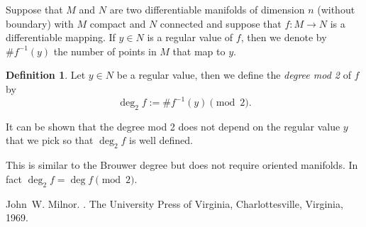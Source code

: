 \documentclass[12pt]{article}
\theoremstyle{theorem}
\theoremstyle{definition}
\newtheorem*{defn}{Definition}
\begin{document}
Suppose that $M$ and $N$ are two differentiable manifolds
of dimension $n$ (without boundary) with $M$ compact and $N$ connected and
 suppose that
$f \colon M \to N$ is a differentiable mapping.  If $y \in N$ is a regular
value of $f$, then we denote by $\# f^{-1}(y)$ the number of points in $M$
that map to $y$.

\begin{defn}
Let $y \in N$ be a regular value, then we define the {\em degree mod 2}  of $f$ by
\begin{equation*}
\operatorname{deg}_2 f := \# f^{-1}(y) \pmod{2} .
\end{equation*}
\end{defn}

It can be shown that the degree mod 2 does not depend on the regular value $y$ that we pick so that $\operatorname{deg}_2 f$ is well defined.

This is similar to the Brouwer degree but does not require oriented manifolds.  In fact $\operatorname{deg}_2 f = \operatorname{deg} f \pmod{2}$.

\begin{thebibliography}{9}
John~W. Milnor.
{\em {}}.
The University Press of Virginia, Charlottesville, Virginia, 1969.
\end{thebibliography}
\end{document}
